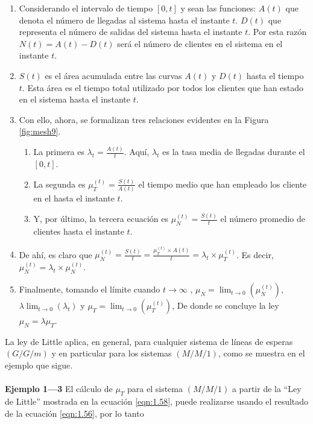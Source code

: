 \begin{enumerate}
    \item Considerando el intervalo de tiempo $ \left [ 0,t \right] $ y sean las funciones: $ A \left ( t \right) $ que denota el número de llegadas al sistema hasta el instante $ t $. $ D\left ( t \right) $ que representa el número de salidas del sistema hasta el instante $ t $. Por esta razón $ N\left ( t \right) = A\left ( t \right)-D\left ( t \right) $ será el número de clientes en el sistema en el instante $ t $. 
    \item $ S\left ( t \right) $ es el área acumulada entre las curvas $ A\left ( t \right) $ y $ D\left ( t \right) $ hasta el tiempo $ t $. Esta área es el tiempo total utilizado por todos los clientes que han estado en el sistema hasta el instante $ t $. 
    \item Con ello, ahora, se formalizan tres relaciones evidentes en la Figura \ref{fig:mesh9}.
    \begin{enumerate}
        \item La primera es $ \lambda_{t} = \frac{A\left ( t \right)}{t} $. Aquí, $ \lambda_{t} $ es la tasa media de llegadas durante el $\left [ 0,t \right]$.
        \item La segunda es $ \mu_{T}^{\left ( t \right)} = \frac{S\left ( t \right)}{A\left ( t \right)} $ el tiempo medio que han empleado los cliente en el hasta el instante $ t $.
        \item Y, por último, la tercera ecuación es $ \mu_{N}^{\left ( t \right)} = \frac{S\left ( t \right)}{t} $ el número promedio de clientes hasta el instante $ t $.
    \end{enumerate}
    \item De ahí, es claro que $ \mu_{N}^{\left ( t \right)} = \frac{S\left ( t \right)}{t} = \frac{\mu_{T}^{\left ( t \right)}\times A\left ( t \right) } {t} = \lambda_{t} \times \mu_{T}^{\left ( t \right)} $. Es decir, $ \mu_{N}^{\left ( t \right)} = \lambda_{t} \times \mu_{N}^{\left ( t \right)} $. 
    \item Finalmente, tomando el límite cuando $ t \to \infty $ , $ \mu _{N} =\lim_{t\to 0} \left ( \mu_{N}^{\left( t \right) } \right ) $, $ \lambda \lim_{t\to 0} \left( \lambda_{t} \right)$ y $ \mu _{T} =\lim_{t\to 0} \left ( \mu_{T}^{\left( t \right) } \right ) $, De donde se concluye la ley $ \mu_{N}= \lambda \mu_{T} $.
\end{enumerate}

La ley de Little aplica, en general, para cualquier sistema de líneas de esperas $ \left ( G/G/m \right ) $ y en particular para los sistemas $ \left ( M/M/1 \right ) $, como se muestra en el ejemplo que sigue.
\\
\\
\textbf{Ejemplo 1—3}
El cálculo de $ \mu _{T} $ para el sistema $ \left ( M/M/1 \right ) $ a partir de la “Ley de Little” mostrada en la ecuación \ref{eqn:1.58}, puede realizarse usando el resultado de la ecuación \ref{eqn:1.56}, por lo tanto $  $



